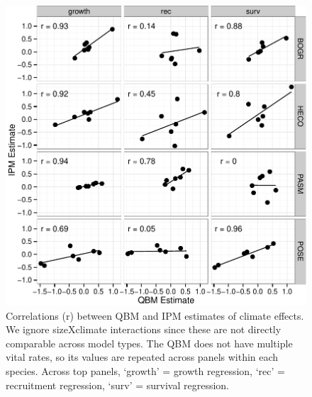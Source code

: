 \documentclass[12pt,]{article}
\begin{document}
\begin{figure}[htbp]
\centering
\includegraphics{components/figure/manuscript-figure_5.pdf}
\caption{Correlations (r) between QBM and IPM estimates of climate
effects. We ignore sizeXclimate interactions since these are not
directly comparable across model types. The QBM does not have multiple
vital rates, so its values are repeated across panels within each
species. Across top panels, `growth' = growth regression, `rec' =
recruitment regression, `surv' = survival regression.}
\end{figure}
\end{document}
